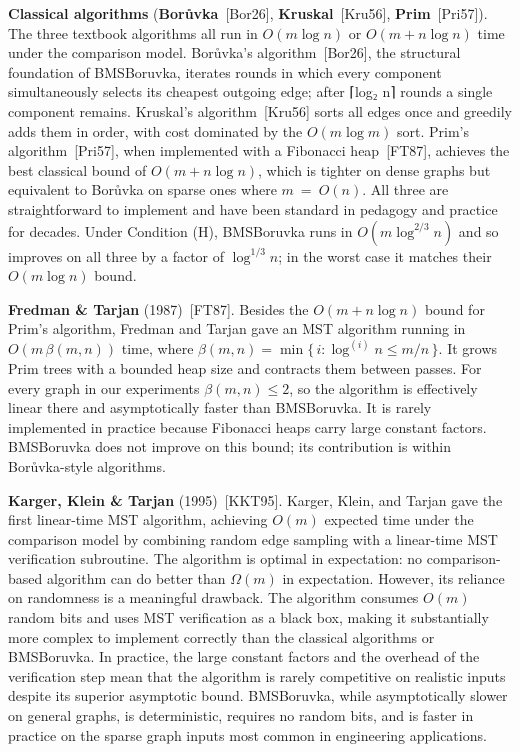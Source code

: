 \documentclass[11pt]{article}
\theoremstyle{plain}
\theoremstyle{remark}
\begin{document}
\textbf{Classical algorithms} (\textbf{Borůvka}~{[}Bor26{]},
\textbf{Kruskal}~{[}Kru56{]}, \textbf{Prim}~{[}Pri57{]}). The three
textbook algorithms all run in \(O(m \log n)\) or \(O(m + n \log n)\)
time under the comparison model. Borůvka's algorithm~{[}Bor26{]}, the
structural foundation of BMSBoruvka, iterates rounds in which every
component simultaneously selects its cheapest outgoing edge; after ⌈log₂
n⌉ rounds a single component remains. Kruskal's algorithm~{[}Kru56{]}
sorts all edges once and greedily adds them in order, with cost
dominated by the \(O(m \log m)\) sort. Prim's algorithm~{[}Pri57{]},
when implemented with a Fibonacci heap~{[}FT87{]}, achieves the best
classical bound of \(O(m + n \log n)\), which is tighter on dense
graphs but equivalent to Borůvka on sparse ones where \(m\  = \ O(n)\).
All three are straightforward to implement and have been standard in
pedagogy and practice for decades. Under Condition (H), BMSBoruvka
runs in \(O(m \log^{2/3} n)\) and so improves on all three by a factor
of \(\log^{1/3} n\); in the worst case it matches their \(O(m \log n)\)
bound.

\textbf{Fredman \& Tarjan} (1987)~{[}FT87{]}. Besides the
\(O(m + n \log n)\) bound for Prim's algorithm, Fredman and Tarjan gave
an MST algorithm running in \(O(m\,\beta(m,n))\) time, where
\(\beta(m,n) = \min\{\, i : \log^{(i)} n \le m/n \,\}\). It grows Prim
trees with a bounded heap size and contracts them between passes. For
every graph in our experiments \(\beta(m,n) \le 2\), so the algorithm is
effectively linear there and asymptotically faster than BMSBoruvka. It
is rarely implemented in practice because Fibonacci heaps carry large
constant factors. BMSBoruvka does not improve on this bound; its
contribution is within Borůvka-style algorithms.

\textbf{Karger, Klein \& Tarjan} (1995)~{[}KKT95{]}. Karger, Klein, and
Tarjan gave the first linear-time MST algorithm, achieving \(O(m)\)
expected time under the comparison model by combining random edge
sampling with a linear-time MST verification subroutine. The algorithm
is optimal in expectation: no comparison-based algorithm can do better
than \(\Omega(m)\) in expectation. However, its reliance on randomness
is a meaningful drawback. The algorithm consumes \(O(m)\) random bits
and uses MST verification as a black box, making it substantially more
complex to implement correctly than the classical algorithms or
BMSBoruvka. In practice, the large constant factors and the overhead of
the verification step mean that the algorithm is rarely competitive on
realistic inputs despite its superior asymptotic bound. BMSBoruvka,
while asymptotically slower on general graphs, is deterministic,
requires no random bits, and is faster in practice on the sparse graph
inputs most common in engineering applications.
\end{document}
